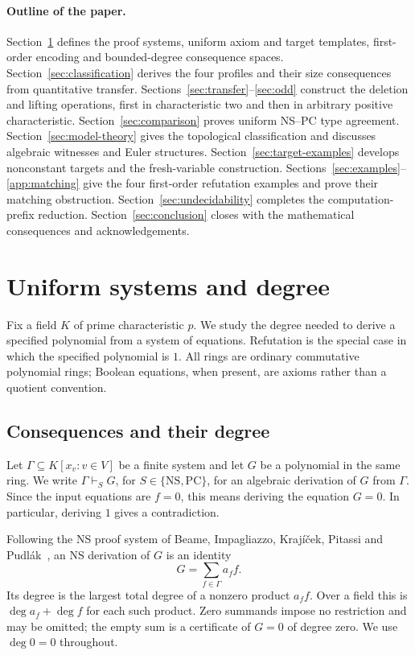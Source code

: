 \documentclass[11pt,a4paper]{article}
\theoremstyle{definition}\newtheorem{definition}[theorem]{Definition}
\theoremstyle{remark}\newtheorem{remark}[theorem]{Remark}
\newcommand{\NS}{\mathrm{NS}}\newcommand{\PC}{\mathrm{PC}}
\begin{document}
\paragraph{Outline of the paper.}
Section~\ref{sec:systems} defines the proof systems, uniform axiom
and target templates, first-order encoding and bounded-degree
consequence spaces. Section~\ref{sec:classification} derives the
four profiles and their size consequences from quantitative transfer.
Sections~\ref{sec:transfer}--\ref{sec:odd} construct the deletion and
lifting operations, first in characteristic two and then in arbitrary
positive characteristic. Section~\ref{sec:comparison} proves uniform
NS--PC type agreement. Section~\ref{sec:model-theory} gives the topological
classification and discusses algebraic witnesses and Euler structures.
Section~\ref{sec:target-examples} develops nonconstant targets and the
fresh-variable construction. Sections~\ref{sec:examples}--\ref{app:matching}
give the four first-order refutation examples and prove their matching
obstruction.
Section~\ref{sec:undecidability} completes the computation-prefix
reduction. Section~\ref{sec:conclusion} closes with the mathematical
consequences and acknowledgements.

\section{Uniform systems and degree}\label{sec:systems}
Fix a field $K$ of prime characteristic $p$. We study the degree needed
to derive a specified polynomial from a system of equations. Refutation
is the special case in which the specified polynomial is $1$. All rings
are ordinary commutative polynomial rings; Boolean equations, when
present, are axioms rather than a quotient convention.

\subsection{Consequences and their degree}
Let $\Gamma\subseteq K[x_v:v\in V]$ be a finite system and let $G$ be a
polynomial in the same ring. We write $\Gamma\vdash_S G$, for
$S\in\{\NS,\PC\}$, for an algebraic derivation of $G$ from $\Gamma$.
Since the input equations are $f=0$, this means deriving the equation
$G=0$. In particular, deriving $1$ gives a contradiction.

Following the NS proof system of Beame, Impagliazzo, Kraj\'i\v cek,
Pitassi and Pudl\'ak~\cite{NSFoundations}, an NS derivation of $G$ is
an identity
\[
                  G=\sum_{f\in\Gamma}a_f f.
\]
Its degree is the largest total degree of a nonzero product $a_f f$.
Over a field this is $\deg a_f+\deg f$ for each such product. Zero
summands impose no restriction and may be omitted; the empty sum is a
certificate of $G=0$ of degree zero. We use $\deg0=0$ throughout.
\end{document}
